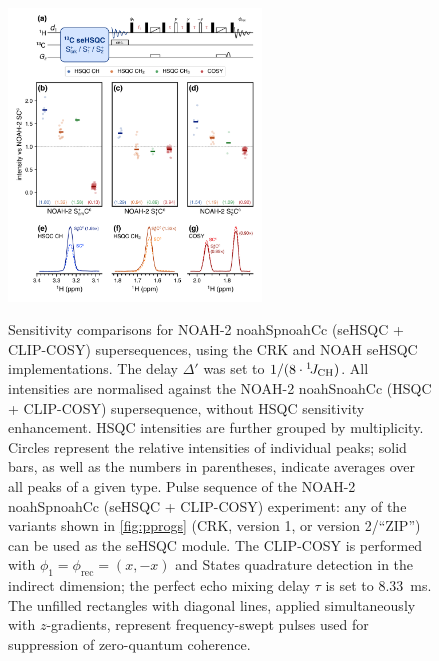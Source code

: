 \documentclass[11pt]{article}
\newcommand*{\noahtwo}[2]{\csname noah#1\endcsname\csname noah#2\endcsname}
\newcommand*{\onejch}{{}^{1}\!J_{\ce{CH}}}
\begin{document}
\begin{refsection}
\begin{figure}
    \centering
    \includegraphics[width=0.6\textwidth]{sehsqc_comp.png}
    {\label{fig:sehsqc_comp_pprog_clipcosy}}
    {\label{fig:sehsqc_comp_crk}}
    {\label{fig:sehsqc_comp_spv1}}
    {\label{fig:sehsqc_comp_spv2}}
    {\label{fig:sehsqc_comp_ex_ch}}
    {\label{fig:sehsqc_comp_ex_ch2}}
    {\label{fig:sehsqc_comp_ex_cosy}}
    \caption{
        Sensitivity comparisons for NOAH-2 \noahtwo{Sp}{Cc} (seHSQC + CLIP-COSY) supersequences, using the CRK and NOAH seHSQC implementations.
        The delay $\Delta'$ was set to $1/(8\cdot\onejch)$.
        All intensities are normalised against the NOAH-2 \noahtwo{S}{Cc} (HSQC + CLIP-COSY) supersequence, without HSQC sensitivity enhancement.
        HSQC intensities are further grouped by multiplicity.
        Circles represent the relative intensities of individual peaks; solid bars, as well as the numbers in parentheses, indicate averages over all peaks of a given type.
        \textbf{} Pulse sequence of the NOAH-2 \noahtwo{Sp}{Cc} (seHSQC + CLIP-COSY) experiment: any of the variants shown in \cref{fig:pprogs} (CRK, version 1, or version 2/``ZIP'') can be used as the seHSQC module.
        The CLIP-COSY\autocite{Koos2016ACIE} is performed with $\phi_1 = \phi_{\text{rec}} = (x, -x)$ and States quadrature detection in the indirect dimension; the perfect echo mixing delay $\tau$ is set to \SI{8.33}{\ms}.
        The unfilled rectangles with diagonal lines, applied simultaneously with $z$-gradients, represent frequency-swept pulses used for suppression of zero-quantum coherence.\autocite{Thrippleton2003ACIE}
}
\end{figure}
\end{refsection}
\end{document}
